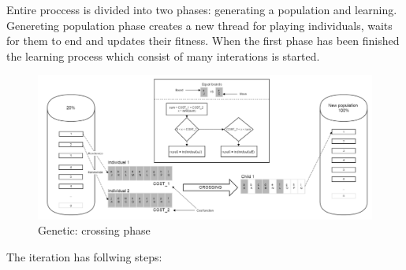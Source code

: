 \documentclass[pdftex]{article}
\begin{document}
Entire proccess is divided into two phases: generating a population and learning.
Genereting population phase creates a new thread for playing individuals, waits for them to end and updates their fitness.
When the first phase has been finished the learning process which consist of many interations is started.

\begin{figure}[!htb]
	\centering
	\includegraphics[width=\textwidth]{genetic/genetic_crossing.png} 
	\caption{Genetic: crossing phase}
	\label{fig:genetic_crossing}
\end{figure}

The iteration has follwing steps:
\end{document}
